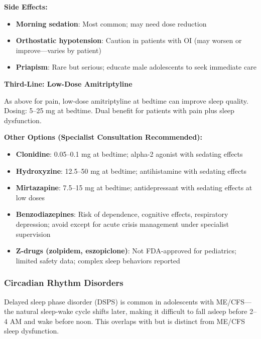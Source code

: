 \begin{protocol}
\textbf{Side Effects:}
\begin{itemize}
    \item \textbf{Morning sedation}: Most common; may need dose reduction
    \item \textbf{Orthostatic hypotension}: Caution in patients with OI (may worsen or improve---varies by patient)
    \item \textbf{Priapism}: Rare but serious; educate male adolescents to seek immediate care
\end{itemize}

\textbf{Third-Line: Low-Dose Amitriptyline}

As above for pain, low-dose amitriptyline at bedtime can improve sleep quality. Dosing: 5--25 mg at bedtime. Dual benefit for patients with pain plus sleep dysfunction.

\textbf{Other Options (Specialist Consultation Recommended):}
\begin{itemize}
    \item \textbf{Clonidine}: 0.05--0.1 mg at bedtime; alpha-2 agonist with sedating effects
    \item \textbf{Hydroxyzine}: 12.5--50 mg at bedtime; antihistamine with sedating effects
    \item \textbf{Mirtazapine}: 7.5--15 mg at bedtime; antidepressant with sedating effects at low doses
\end{itemize}

\begin{practicalwarning}
\begin{itemize}
    \item \textbf{Benzodiazepines}: Risk of dependence, cognitive effects, respiratory depression; avoid except for acute crisis management under specialist supervision
    \item \textbf{Z-drugs (zolpidem, eszopiclone)}: Not FDA-approved for pediatrics; limited safety data; complex sleep behaviors reported
\end{itemize}
\end{practicalwarning}
\end{protocol}

\subsubsection{Circadian Rhythm Disorders}

Delayed sleep phase disorder (DSPS) is common in adolescents with ME/CFS---the natural sleep-wake cycle shifts later, making it difficult to fall asleep before 2--4 AM and wake before noon. This overlaps with but is distinct from ME/CFS sleep dysfunction.

